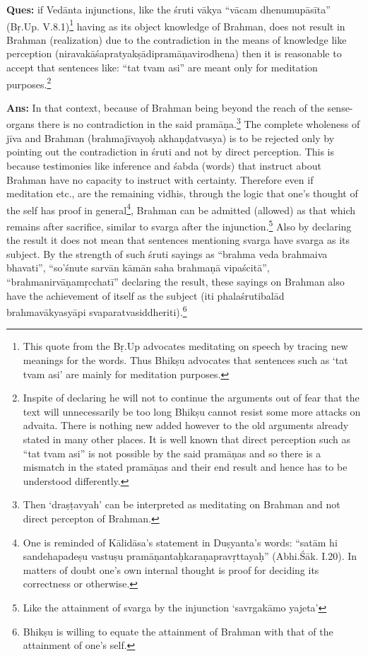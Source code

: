 \textbf{Ques:} if Vedānta injunctions, like the śruti vākya “vācam dhenumupā\-sīta” (Bṛ.Up. V.8.1)\footnote{This quote from the Bṛ.Up advocates meditating on speech by tracing new meanings for the words. Thus Bhikṣu advocates that sentences such as ‘tat tvam asi’ are mainly for meditation purposes.}  having as its object knowledge of Brahman, does not result in Brahman (realization) due to the contradiction in the means of knowledge like perception (niravakāśapratyakṣādipramāṇa\-virodhena) then it is reasonable to accept that sentences like: “tat tvam asi” are meant only for meditation purposes.\footnote{Inspite of declaring he will not to continue the arguments out of fear that the text will unnecessarily be too long Bhikṣu cannot resist some more attacks on advaita. There is nothing new added however to the old arguments already stated in many other places. It is well known that direct perception such as “tat tvam asi” is not possible by the said pramāṇas and so there is a mismatch in the stated pramāṇas and their end result and hence has to be understood differently.} 

\eject

\textbf{Ans:} In that context, because of Brahman being beyond the reach of the sense-organs there is no contradiction in the said pramāṇa.\footnote{Then ‘draṣṭavyah’ can be interpreted as meditating on Brahman and not direct percepton of Brahman.} The complete wholeness of jīva and Brahman (brahmajīvayoḥ akhaṇḍatvasya) is to be rejected only by pointing out the contradiction in śruti and not by direct perception. This is because testimonies like inference and śabda (words) that instruct about Brahman have no capacity to instruct with certainty. Therefore even if meditation etc., are the remaining vidhis, through the logic that one’s thought of the self has proof in general\footnote{One is reminded of Kālidāsa’s statement in Duṣyanta’s words: “satām hi sandehapadeṣu vastuṣu pramāṇantaḥkaraṇapravṛttayaḥ” (Abhi.Śāk. I.20). In matters of doubt one’s own internal thought is proof for deciding its correctness or otherwise.}, Brahman can be admitted (allowed) as that which remains after sacrifice, similar to svarga after the injunction.\footnote{Like the attainment of svarga by the injunction ‘savrgakāmo yajeta’} Also by declaring the result it does not mean that sentences mentioning svarga have svarga as its subject. By the strength of such śruti sayings as “brahma veda brahmaiva bhavati”, “so’śnute sarvān kāmān saha brahmaṇā vipaścitā”, “brahmanirvāṇamṛcchatī” declaring the result, these sayings on Brahman also have the achievement of itself as the subject (iti phalaśrutibalād brahmavākyasyāpi svaparatvasiddheriti).\footnote{Bhikṣu is willing to equate the attainment of Brahman with that of the attainment of one’s self.}


